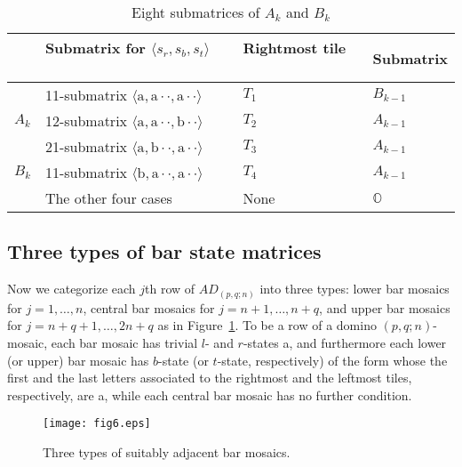 \documentclass[11pt,a4paper]{amsart}
\begin{document}
\begin{table}[h]
\def\arraystretch{1.2} 
\begin{tabular}{clll}      \hline \hline
 & Submatrix for $\langle s_r, s_b, s_t \rangle$ \ \ & Rightmost tile \ & Submatrix \\    \hline
\multirow{3}{5mm}{$A_k$}
 & 11-submatrix $\langle \text{a}, \text{a} \! \cdot \! \cdot,\text{a} \! \cdot \! \cdot \rangle$ 
 & $T_1$ &  $B_{k-1}$ \\
 & 12-submatrix $\langle \text{a}, \text{a} \! \cdot \! \cdot,\text{b} \! \cdot \! \cdot \rangle$
 & $T_2$ & $A_{k-1}$ \\
 & 21-submatrix $\langle \text{a}, \text{b} \! \cdot \! \cdot,\text{a} \! \cdot \! \cdot \rangle$
 & $T_3$ & $A_{k-1}$ \\    \hline
\multirow{1}{3mm}{$B_k$}
 & 11-submatrix $\langle \text{b}, \text{a} \! \cdot \! \cdot,\text{a} \! \cdot \! \cdot \rangle$ 
 & $T_4$ & $A_{k-1}$ \\    \hline
 & The other four cases & None & $\mathbb{O}$ \\  \hline \hline
\end{tabular}
\vspace{4mm}
\caption{Eight submatrices of $A_k$ and $B_k$}
\label{tab:barset}
\end{table}


\subsection{Three types of bar state matrices} 
Now we categorize each $j$th row of $AD_{(p,q;n)}$ into three types:
lower bar mosaics for $j \! = \! 1, \dots, n$,
central bar mosaics for $j \! = \! n \! + \! 1, \dots, n \! + q$,
and upper bar mosaics for $j \! = \! n \! + \! q \! + \! 1, \dots, 2n \! + q$
as in Figure~\ref{fig:threebars}.
To be a row of a domino $(p,q;n)$-mosaic, each bar mosaic has trivial $l$- and $r$-states a,
and furthermore each lower (or upper) bar mosaic has $b$-state (or $t$-state, respectively)
of the form whose the first and the last letters associated to the rightmost and the leftmost tiles, respectively, are a,
while each central bar mosaic has no further condition.

\begin{figure}[h]
\texttt{[image: fig6.eps]}
\caption{Three types of suitably adjacent bar mosaics.}
\label{fig:threebars}
\end{figure}
\end{document}
